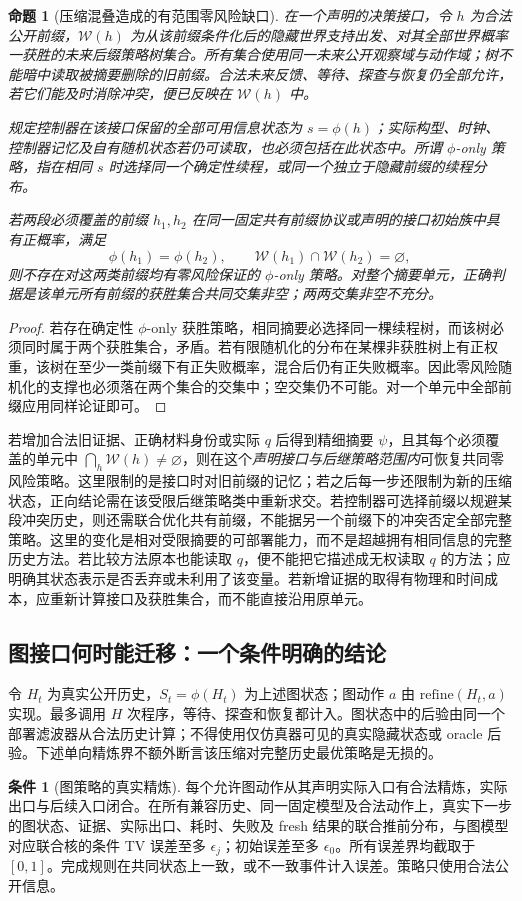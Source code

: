 \documentclass[11pt,a4paper,fontset=fandol]{ctexart}
\newtheorem{proposition}[theorem]{命题}
\theoremstyle{definition}
\newtheorem{assumption}[theorem]{条件}
\theoremstyle{remark}\newtheorem{remark}[theorem]{说明}
\numberwithin{equation}{section}
\begin{document}
\begin{proposition}[压缩混叠造成的有范围零风险缺口]
\label{prop:compressed_history_conflict}
在一个声明的决策接口，令 $h$ 为合法公开前缀，$\mathcal W(h)$ 为从该前缀条件化后的隐藏世界支持出发、对其全部世界概率一获胜的\emph{未来后缀}策略树集合。所有集合使用同一未来公开观察域与动作域；树不能暗中读取被摘要删除的旧前缀。合法未来反馈、等待、探查与恢复仍全部允许，若它们能及时消除冲突，便已反映在 $\mathcal W(h)$ 中。

规定控制器在该接口保留的全部可用信息状态为 $s=\phi(h)$；实际构型、时钟、控制器记忆及自有随机状态若仍可读取，也必须包括在此状态中。所谓 $\phi$-only 策略，指在相同 $s$ 时选择同一个确定性续程，或同一个独立于隐藏前缀的续程分布。

若两段必须覆盖的前缀 $h_1,h_2$ 在同一固定共有前缀协议或声明的接口初始族中具有正概率，满足
\[
 \phi(h_1)=\phi(h_2),\qquad
 \mathcal W(h_1)\cap\mathcal W(h_2)=\varnothing,
\]
则不存在对这两类前缀均有零风险保证的 $\phi$-only 策略。对整个摘要单元，正确判据是该单元所有前缀的获胜集合共同交集非空；两两交集非空不充分。
\end{proposition}
\begin{proof}
若存在确定性 $\phi$-only 获胜策略，相同摘要必选择同一棵续程树，而该树必须同时属于两个获胜集合，矛盾。若有限随机化的分布在某棵非获胜树上有正权重，该树在至少一类前缀下有正失败概率，混合后仍有正失败概率。因此零风险随机化的支撑也必须落在两个集合的交集中；空交集仍不可能。对一个单元中全部前缀应用同样论证即可。
\end{proof}

若增加合法旧证据、正确材料身份或实际 $q$ 后得到精细摘要 $\psi$，且其每个必须覆盖的单元中 $\bigcap_h\mathcal W(h)\ne\varnothing$，则在这个\emph{声明接口与后继策略范围内}可恢复共同零风险策略。这里限制的是接口时对旧前缀的记忆；若之后每一步还限制为新的压缩状态，正向结论需在该受限后继策略类中重新求交。若控制器可选择前缀以规避某段冲突历史，则还需联合优化共有前缀，不能据另一个前缀下的冲突否定全部完整策略。这里的变化是相对受限摘要的可部署能力，而不是超越拥有相同信息的完整历史方法。若比较方法原本也能读取 $q$，便不能把它描述成无权读取 $q$ 的方法；应明确其状态表示是否丢弃或未利用了该变量。若新增证据的取得有物理和时间成本，应重新计算接口及获胜集合，而不能直接沿用原单元。


\subsection{图接口何时能迁移：一个条件明确的结论}
令 $H_t$ 为真实公开历史，$S_t=\phi(H_t)$ 为上述图状态；图动作 $a$ 由 $\mathrm{refine}(H_t,a)$ 实现。最多调用 $H$ 次程序，等待、探查和恢复都计入。图状态中的后验由同一个部署滤波器从合法历史计算；不得使用仅仿真器可见的真实隐藏状态或 oracle 后验。下述单向精炼界不额外断言该压缩对完整历史最优策略是无损的。
\begin{assumption}[图策略的真实精炼]
\label{ass:graph_refine}
每个允许图动作从其声明实际入口有合法精炼，实际出口与后续入口闭合。在所有兼容历史、同一固定模型及合法动作上，真实下一步的图状态、证据、实际出口、耗时、失败及 fresh 结果的联合推前分布，与图模型对应联合核的条件 TV 误差至多 $\epsilon_j$；初始误差至多 $\epsilon_0$。所有误差界均截取于 $[0,1]$。完成规则在共同状态上一致，或不一致事件计入误差。策略只使用合法公开信息。
\end{assumption}
\end{document}
